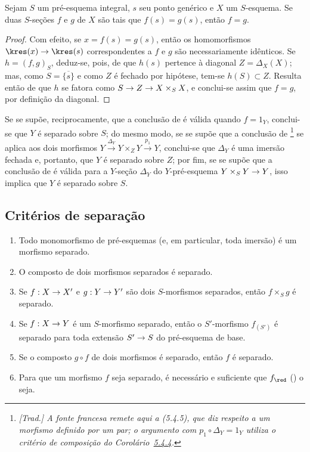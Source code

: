 \documentclass[oneside]{amsart}
\makeatletter
\newcommand{\ega@arrow}[2]{\mathchoice{#1}{#2}{#2}{#2}}
\renewcommand{\to}{\ega@arrow{\longrightarrow}{\rightarrow}}
\let\EGAOriginalLabel\label
\renewcommand{\label}[1]{\phantomsection\EGAOriginalLabel{#1}}
\makeatother
\begin{document}
\begin{corollary}[5.4.7]
\label{I.5.4.7}
Sejam $S$ um pré-esquema integral, $s$ seu ponto genérico e $X$ um $S$-esquema.
Se duas $S$-seções $f$ e $g$ de $X$ são tais que $f(s)=g(s)$, então $f=g$.
\end{corollary}

\begin{proof}
Com efeito, se $x=f(s)=g(s)$, então os homomorfismos $\kres(x)\to\kres(s)$ correspondentes a $f$ e $g$ são necessariamente idênticos.
Se $h=(f,g)_S$, deduz-se, pois, de  que $h(s)$ pertence à diagonal $Z=\Delta_X(X)$;
mas, como $S=\overline{\{s\}}$ e como $Z$ é fechado por hipótese, tem-se $h(S)\subset Z$.
Resulta então de  que $h$ se fatora como $S\to Z\to X\times_S X$, e conclui-se assim que $f=g$, por definição da diagonal.
\end{proof}

\begin{remark}[5.4.8]
\label{I.5.4.8}
Se se supõe, reciprocamente, que a conclusão de  é válida quando $f=1_Y$, conclui-se que $Y$ é separado sobre $S$;
do mesmo modo, se se supõe que a conclusão de \footnote{\emph{[Trad.] A fonte francesa remete aqui a (5.4.5), que diz respeito a um morfismo definido por um par; o argumento com $p_1\circ\Delta_Y=1_Y$ utiliza o critério de composição do Corolário~\hyperref[I.5.4.4]{5.4.4}.}} se aplica aos dois morfismos $Y\xrightarrow{\Delta_Y}Y\times_Z Y\xrightarrow{p_1}Y$, conclui-se que $\Delta_Y$ é uma imersão fechada e, portanto, que $Y$ é separado sobre $Z$;
por fim, se se supõe que a conclusão de  é válida para a $Y$-seção $\Delta_Y$ do $Y$-pré-esquema $Y\times_S Y\to Y$, isso implica que $Y$ é separado sobre $S$.
\end{remark}

\subsection{Critérios de separação}
\label{subsection:I.5.5}

\begin{proposition}[5.5.1]
\label{I.5.5.1}
\begin{enumerate}
  \item[\rm(i)] Todo monomorfismo de pré-esquemas (e, em particular, toda
    imersão) é um morfismo separado.
  \item[\rm(ii)] O composto de dois morfismos separados é separado.
  \item[\rm(iii)] Se $f:X\to X'$ e $g:Y\to Y'$ são dois $S$-morfismos
    separados, então $f\times_S g$ é separado.
  \item[\rm(iv)] Se $f:X\to Y$ é um $S$-morfismo separado, então o
    $S'$-morfismo $f_{(S')}$ é separado para toda extensão $S'\to S$ do
    pré-esquema de base.
  \item[\rm(v)] Se o composto $g\circ f$ de dois morfismos é separado, então
    $f$ é separado.
  \item[\rm(vi)] Para que um morfismo $f$ seja separado, é necessário e
    suficiente que $f_\red$ () o seja.
\end{enumerate}
\end{proposition}
\end{document}
